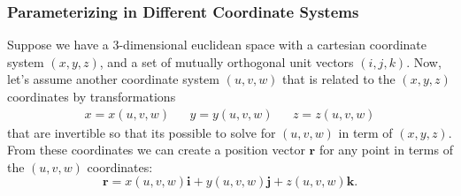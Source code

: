 \subsubsection{Parameterizing in Different Coordinate Systems}
Suppose we have a 3-dimensional euclidean space with a cartesian coordinate system $(x, y, z)$, and a set of mutually orthogonal unit vectors $(i,j,k)$. Now, let's assume another coordinate system $(u,v,w)$ that is related to the $(x,y,z)$ coordinates by transformations
\begin{align}
x=x(u,v,w) && y=y(u,v,w) && z=z(u,v,w)
\end{align}
that are invertible so that its possible to solve for $(u,v,w)$ in term of $(x,y,z)$. From these coordinates we can create a position vector $\bm r$ for any point in terms of the $(u,v,w)$ coordinates:
 \begin{equation}
\bm r = x(u,v,w) \bm i + y(u,v,w) \bm j + z(u,v,w) \bm k.
\end{equation}